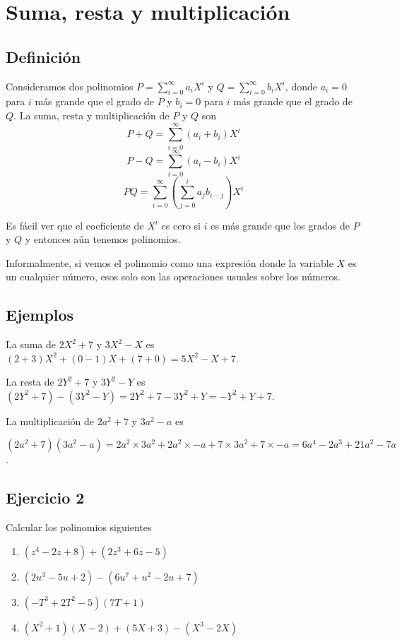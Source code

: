 \section{Suma, resta y multiplicación}

\subsection*{Definición}

Consideramos dos polinomios $P = \sum_{i = 0}^{\infty} a_i X^i$ y
$Q = \sum_{i = 0}^{\infty} b_i X^i$, donde $a_i = 0$ para $i$ más grande que el
grado de $P$ y $b_i = 0$ para $i$ más grande que el grado de $Q$.
La suma, resta y multiplicación de $P$ y $Q$ son
$$P + Q = \sum_{i = 0}^{\infty} {(a_i + b_i)} X^i$$
$$P - Q = \sum_{i = 0}^{\infty} {(a_i - b_i)} X^i$$
$$PQ = \sum_{i = 0}^{\infty} \left(\sum_{j = 0}^{i} a_{j} b_{i - j}\right) X^i$$

Es fácil ver que el coeficiente de $X^i$ es cero si $i$ es más grande que los
grados de $P$ y $Q$ y entonces aún tenemos polinomios.

Informalmente, si vemos el polinomio como una expresión donde la variable $X$
es un cualquier número, esos solo son las operaciones usuales sobre los números.

\subsection*{Ejemplos}

La suma de $2X^2 + 7$ y $3X^2 - X$ es $(2+3)X^2 + (0-1)X + (7+0) = 5X^2 - X + 7$.

La resta de $2Y^2 + 7$ y $3Y^2 - Y$ es $(2Y^2 + 7) - (3Y^2 - Y) = 2Y^2 + 7 - 3Y^2 + Y = -Y^2 + Y + 7$.

La multiplicación de $2a^2 + 7$ y $3a^2 - a$ es

$(2a^2 + 7)(3a^2 - a) = 2a^2 \times 3a^2 + 2a^2 \times -a + 7 \times 3a^2 +
7 \times -a = 6a^4 - 2a^3 + 21a^2 - 7a$.

\subsection*{Ejercicio 2}

Calcular los polinomios siguientes

\begin{enumerate}
\item $(z^4 - 2z + 8) + (2z^3 + 6z - 5)$
\item $(2u^3 - 5u + 2) - (6u^7 + u^2 - 2u + 7)$
\item ${(-T^3 + 2T^2 - 5)}{(7T + 1)}$
\item $(X^2 + 1)(X - 2) + (5X+3) - (X^3 - 2X)$
\end{enumerate}

